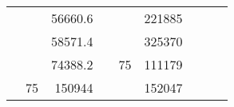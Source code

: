 \begin{table}[]
\begin{tabular}{|ccrccrccc}
\multicolumn{1}{|c|}{\cellcolor[HTML]{FFFFC7}}                                & \multicolumn{1}{c|}{\cellcolor[HTML]{DAE8FC}}                      & \multicolumn{1}{r|}{\cellcolor[HTML]{DAE8FC}56660.6}   & \multicolumn{1}{c|}{\cellcolor[HTML]{FFFFC7}}                                & \multicolumn{1}{c|}{\cellcolor[HTML]{DAE8FC}}                       & \multicolumn{1}{r|}{\cellcolor[HTML]{DDFDFF}221885}    &                                                                              &                                                                    &                                                        \\ \cline{3-3} \cline{6-6}
\multicolumn{1}{|c|}{\cellcolor[HTML]{FFFFC7}}                                & \multicolumn{1}{c|}{\cellcolor[HTML]{DAE8FC}}                      & \multicolumn{1}{r|}{\cellcolor[HTML]{DDFDFF}58571.4}   & \multicolumn{1}{c|}{\cellcolor[HTML]{FFFFC7}}                                & \multicolumn{1}{c|}{\cellcolor[HTML]{DAE8FC}}                       & \multicolumn{1}{r|}{\cellcolor[HTML]{DAE8FC}325370}    &                                                                              &                                                                    &                                                        \\ \cline{3-3} \cline{6-6}
\multicolumn{1}{|c|}{\cellcolor[HTML]{FFFFC7}}                                & \multicolumn{1}{c|}{\cellcolor[HTML]{DAE8FC}}                      & \multicolumn{1}{r|}{\cellcolor[HTML]{DAE8FC}74388.2}   & \multicolumn{1}{c|}{\cellcolor[HTML]{FFFFC7}}                                & \multicolumn{1}{c|}{\multirow{-10}{*}{\cellcolor[HTML]{DAE8FC}75}}  & \multicolumn{1}{r|}{\cellcolor[HTML]{DDFDFF}111179}    &                                                                              &                                                                    &                                                        \\ \cline{3-3} \cline{5-6}
\multicolumn{1}{|c|}{\cellcolor[HTML]{FFFFC7}}                                & \multicolumn{1}{c|}{\multirow{-10}{*}{\cellcolor[HTML]{DAE8FC}75}} & \multicolumn{1}{r|}{\cellcolor[HTML]{DDFDFF}150944}    & \multicolumn{1}{c|}{\cellcolor[HTML]{FFFFC7}}                                & \multicolumn{1}{c|}{\cellcolor[HTML]{DDFDFF}}                       & \multicolumn{1}{r|}{\cellcolor[HTML]{DAE8FC}152047}    &                                                                              &                                                                    &                                                        \\ \cline{2-3} \cline{6-6}

\end{tabular}
\end{table}
